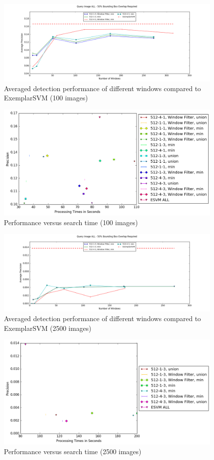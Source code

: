 \begin{figure}
\centering
\includegraphics[width=\linewidth]{images/db2_window_comparison-ALL}
\caption{Averaged detection performance of different windows compared to ExemplarSVM (100 images)}
\label{fig:db2_window_comparison-ALL}
\end{figure}


\begin{figure}
\centering
\includegraphics[width=0.7\linewidth]{images/db2_t_vs_p-ALL}
\caption{Performance versus search time (100 images)}
\label{fig:db2_t_vs_p-ALL}
\end{figure}

\begin{figure}
\centering
\includegraphics[width=\linewidth]{images/val_window_comparison-ALL}
\caption{Averaged detection performance of different windows compared to ExemplarSVM (2500 images)}
\label{fig:val_window_comparison-ALL}
\end{figure}


\begin{figure}
\centering
\includegraphics[width=0.7\linewidth]{images/val_t_vs_p-ALL}
\caption{Performance versus search time (2500 images)}
\label{fig:val_t_vs_p-ALL}
\end{figure}
